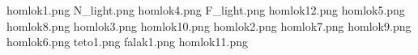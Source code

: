 homlok1.png
N_light.png
homlok4.png
F_light.png
homlok12.png
homlok5.png
homlok8.png
homlok3.png
homlok10.png
homlok2.png
homlok7.png
homlok9.png
homlok6.png
teto1.png
falak1.png
homlok11.png
